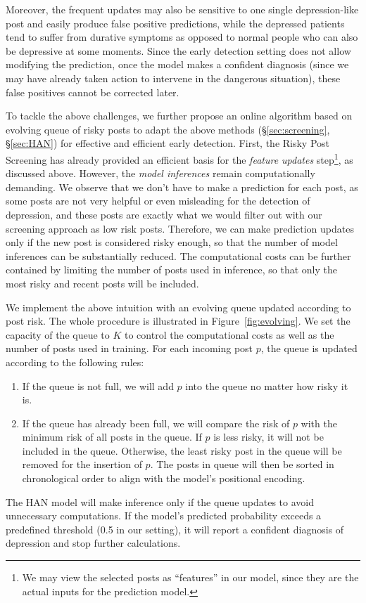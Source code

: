 Moreover, the frequent updates may also be sensitive to one single depression-like post and easily produce false positive predictions, while the depressed patients tend to suffer from durative symptoms  \citep{kroenke2001phq} as opposed to normal people who can also be depressive at some moments. Since the early detection setting does not allow modifying the prediction, once the model makes a confident diagnosis (since we may have already taken action to intervene in the dangerous situation), these false positives cannot be corrected later.

To tackle the above challenges, we further propose an online algorithm based on evolving queue of risky posts to adapt the above methods (\S \ref{sec:screening}, \S \ref{sec:HAN}) for effective and efficient early detection. First, the Risky Post Screening has already provided an efficient basis for the \textit{feature updates} step\footnote{We may view the selected posts as ``features'' in our model, since they are the actual inputs for the prediction model.}, as discussed above. However, the \textit{model inferences} remain computationally demanding. We observe that we don't have to make a prediction for each post, as some posts are not very helpful or even misleading for the detection of depression, and these posts are exactly what we would filter out with our screening approach as low risk posts. 
Therefore, we can make prediction updates only if the new post is considered 
risky enough, so that the number of model inferences can be substantially reduced. The computational costs can be further contained by limiting the number of posts used in inference, so that only the most risky and recent posts will be included.

We implement the above intuition with an evolving queue updated according to 
post risk. The whole procedure is illustrated in Figure~\ref{fig:evolving}. 
We set the capacity of the queue to $K$ to control the computational costs 
as well as the number of posts used in training. 
For each incoming post $p$, the queue is updated according to the 
following rules: 
\begin{enumerate}
    \item If the queue is not full, we will add $p$ into the queue no matter how risky it is.
    \item If the queue has already been full, we will compare the risk of $p$ with the minimum risk of all posts in the queue. If $p$ is less risky, it will not be included in the queue. Otherwise, the least risky post in the queue will be removed for the insertion of $p$. The posts in queue will then be sorted in chronological order to align with the model's positional encoding.
\end{enumerate}

The HAN model will make inference only if the queue updates to avoid unnecessary computations. If the model's predicted probability exceeds a predefined threshold (0.5 in our setting), it will report a confident diagnosis of depression and stop further calculations.
